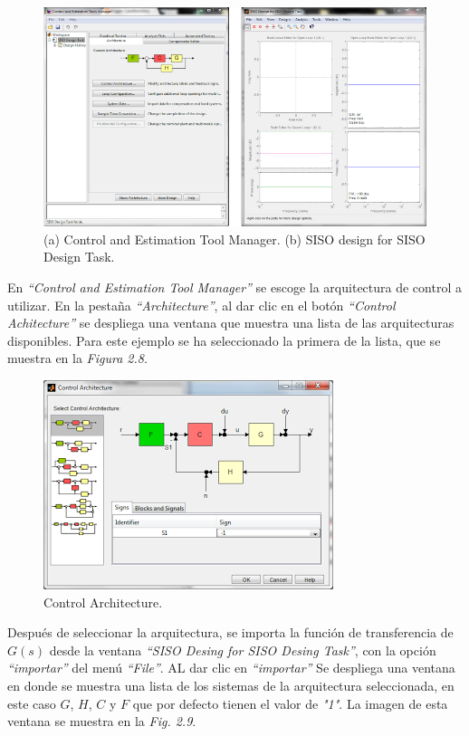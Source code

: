 \documentclass[a4paper,12pt,twoside]{proyectotanquesecci}
\begin{document}
\begin{figure}[h]
\centering
\includegraphics[scale=0.5]{Ventana1}
\renewcommand{\figurename}{Fig.}
\caption{(a) Control and Estimation Tool Manager. (b) SISO design for SISO Design Task.}
\label{Control and Estimation Tool Manager.}
\end{figure}

En \textit{“Control and Estimation Tool Manager”} se escoge la arquitectura de control a utilizar. En la pestaña \textit{“Architecture”}, al dar clic en el botón \textit{“Control Achitecture”} se despliega una ventana que muestra una lista de las arquitecturas disponibles. Para este ejemplo se ha seleccionado la primera de la lista, que se muestra en la \textit{Figura 2.8}. \\

\begin{figure}[h]
\centering
\includegraphics[scale=0.7]{Ventana2}
\renewcommand{\figurename}{Fig.}
\caption{Control Architecture.}
\label{Control Architecture.}
\end{figure}

Después de seleccionar la arquitectura, se importa la función de transferencia de $G(s)$ desde la ventana \textit{“SISO Desing for SISO Desing Task”},  con la opción \textit{“importar”} del menú \textit{“File”}. AL dar clic en \textit{“importar”} Se despliega una ventana en donde se muestra una lista de los sistemas de la arquitectura seleccionada, en este caso  $G$, $H$, $C$ y $F$ que por defecto tienen el valor de \textit{"1"}. La imagen de esta ventana se muestra en la \textit{Fig. 2.9}. \\
\end{document}
